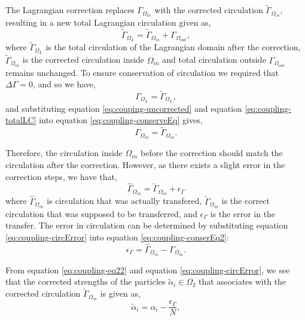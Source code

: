 	The Lagrangian correction replaces $\Gamma_{\Omega_{in}}$ with the corrected circulation $\tilde{\Gamma}_{\Omega_{in}}$, resulting in a new total Lagrangian circulation given as,
		\begin{equation}
		\tilde{\Gamma}_{\Omega_L} = \tilde{\Gamma}_{\Omega_{in}} + \Gamma_{\Omega_{out}},
		\label{eq:coupling-totalLC}
		\end{equation}
	where $\tilde{\Gamma}_{\Omega_L}$ is the total circulation of the Lagrangian domain after the correction, $\tilde{\Gamma}_{\Omega_{in}}$ is the corrected circulation inside $\Omega_{in}$ and total circulation outside $\Gamma_{\Omega_{out}}$ remains unchanged. To ensure conservation of circulation we required that $\Delta \Gamma=0$, and so we have,
		\begin{equation}
		\Gamma_{\Omega_L} = \tilde{\Gamma}_{\Omega_L},
		\label{eq:coupling-conserveEq}
		\end{equation}
	and substituting equation \ref{eq:couping-uncorrected} and equation \ref{eq:coupling-totalLC} into equation 		\ref{eq:coupling-conserveEq} gives,
		\begin{equation}
		\Gamma_{\Omega_{in}} = \tilde{\Gamma}_{\Omega_{in}}.
		\label{eq:coupling-conserEq2}
		\end{equation}

	Therefore, the circulation inside $\Omega_{in}$ before the correction should match the circulation after the correction. However, as there exists a slight error in the correction steps, we have that,
		\begin{equation}
		\hat{\Gamma}_{\Omega_{in}} = \tilde{\Gamma}_{\Omega_{in}} + \epsilon_{\Gamma}
		\label{eq:coupling-circError}
		\end{equation}
	where $\hat{\Gamma}_{\Omega_{in}}$ is circulation that was actually transfered, $\tilde{\Gamma}_{\Omega_{in}}$ is the correct circulation that was supposed to be transferred, and $\epsilon_{\Gamma}$ is the error in the transfer. The error in circulation can be determined by substituting equation \ref{eq:coupling-circError} into equation 		\ref{eq:coupling-conserEq2}:
		\begin{equation}
		\epsilon_{\Gamma} = \hat{\Gamma}_{\Omega_{in}} - \Gamma_{\Omega_{in}}.
		\label{eq:coupling-eq22}
		\end{equation}
		
	From equation \ref{eq:coupling-eq22} and equation \ref{eq:coupling-circError}, we see that the corrected strengths of the particles $\tilde{\alpha}_i \in \Omega_{I}$ that associates with the corrected circulation $\tilde{\Gamma}_{\Omega_{in}}$ is given as,
		\begin{equation}
		\tilde{\alpha}_i = \alpha_i - \frac{\epsilon_{\Gamma}}{N},
		\end{equation}

